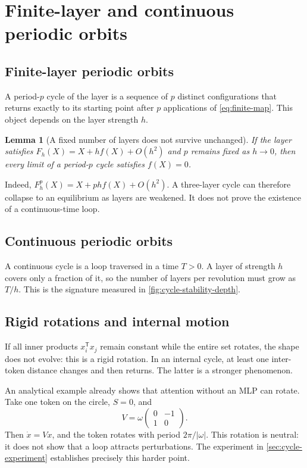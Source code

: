 \documentclass[11pt,a4paper]{article}
\newtheorem{lemma}[theorem]{Lemma}
\theoremstyle{definition}
\newcommand{\T}{\mathsf T}
\begin{document}
\section{Finite-layer and continuous periodic orbits}
\label{sec:cycles}

\subsection{Finite-layer periodic orbits}

A period-$p$ cycle of the layer is a sequence of $p$ distinct configurations that
returns exactly to its starting point after $p$ applications of \eqref{eq:finite-map}.
This object depends on the layer strength $h$.

\begin{lemma}[A fixed number of layers does not survive unchanged]
\label{lem:fixed-period}
If the layer satisfies $F_h(X)=X+h f(X)+O(h^2)$ and $p$ remains fixed as $h\to0$, then
every limit of a period-$p$ cycle satisfies $f(X)=0$.
\end{lemma}

Indeed, $F_h^p(X)=X+phf(X)+O(h^2)$. A three-layer cycle can therefore collapse to an
equilibrium as layers are weakened. It does not prove the existence of a continuous-time
loop.

\subsection{Continuous periodic orbits}

A continuous cycle is a loop traversed in a time $T>0$. A layer of strength $h$ covers
only a fraction of it, so the number of layers per revolution must grow as $T/h$. This
is the signature measured in \cref{fig:cycle-stability-depth}.

\subsection{Rigid rotations and internal motion}

If all inner products $x_i^{\T}x_j$ remain constant while the entire set rotates, the
shape does not evolve: this is a rigid rotation. In an internal cycle, at least one
inter-token distance changes and then returns. The latter is a stronger phenomenon.

An analytical example already shows that attention without an MLP can rotate. Take one
token on the circle, $S=0$, and
\[
 V=\omega\begin{pmatrix}0&-1\\1&0\end{pmatrix}.
\]
Then $\dot x=Vx$, and the token rotates with period $2\pi/|\omega|$. This rotation is
neutral: it does not show that a loop attracts perturbations. The experiment in
\cref{sec:cycle-experiment} establishes precisely this harder point.
\end{document}

